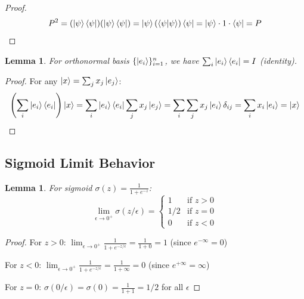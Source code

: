\documentclass[11pt,a4paper]{article}
\newtheorem{lemma}[theorem]{Lemma}
\theoremstyle{definition}
\begin{document}
\begin{proof}
\begin{equation}
P^2 = (\ket{\psi}\bra{\psi})(\ket{\psi}\bra{\psi}) = \ket{\psi}(\braket{\psi|\psi})\bra{\psi} = \ket{\psi} \cdot 1 \cdot \bra{\psi} = P
\end{equation}
\end{proof}

\begin{lemma}
For orthonormal basis $\{\ket{e_i}\}_{i=1}^n$, we have $\sum_i \ket{e_i}\bra{e_i} = I$ (identity).
\end{lemma}

\begin{proof}
For any $\ket{x} = \sum_j x_j \ket{e_j}$:
\begin{equation}
\left(\sum_i \ket{e_i}\bra{e_i}\right)\ket{x} = \sum_i \ket{e_i} \bra{e_i} \sum_j x_j \ket{e_j} = \sum_i \sum_j x_j \ket{e_i} \delta_{ij} = \sum_i x_i \ket{e_i} = \ket{x}
\end{equation}
\end{proof}

\subsection{Sigmoid Limit Behavior}

\begin{lemma}
For sigmoid $\sigma(z) = \frac{1}{1+e^{-z}}$:
\begin{equation}
\lim_{\epsilon \to 0^+} \sigma(z/\epsilon) = \begin{cases} 1 & \text{if } z > 0 \\ 1/2 & \text{if } z = 0 \\ 0 & \text{if } z < 0 \end{cases}
\end{equation}
\end{lemma}

\begin{proof}
For $z > 0$: $\lim_{\epsilon \to 0^+} \frac{1}{1+e^{-z/\epsilon}} = \frac{1}{1+0} = 1$ (since $e^{-\infty} = 0$)

For $z < 0$: $\lim_{\epsilon \to 0^+} \frac{1}{1+e^{-z/\epsilon}} = \frac{1}{1+\infty} = 0$ (since $e^{+\infty} = \infty$)

For $z = 0$: $\sigma(0/\epsilon) = \sigma(0) = \frac{1}{1+1} = 1/2$ for all $\epsilon$
\end{proof}
\end{document}
